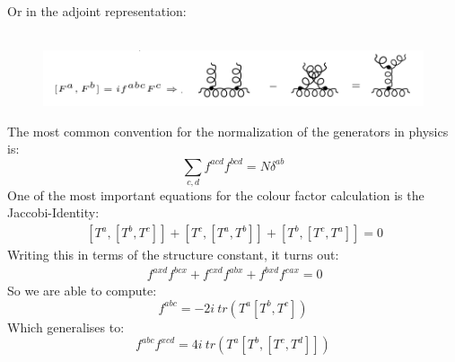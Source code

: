 Or in the adjoint representation:\\
\\
\begin{figure}[h!]
\centering
\includegraphics[scale=0.6]{images/Intro/CasimirAdj.png}
\end{figure}

The most common convention for the normalization of the generators in physics is:
\begin{equation}
\displaystyle\sum\limits_{c,d} f^{acd} f^{bcd} = N \delta^{ab}
\end{equation}
One of the most important equations for the colour factor calculation is the Jaccobi-Identity:
\begin{equation}
\begin{split}\:
[T^a, [T^b , T^c]]+[T^c, [T^a , T^b]]+[T^b, [T^c , T^a]]=0
\end{split}
\end{equation}
Writing this in terms of the structure constant, it turns out:
\begin{equation}
\begin{split}\:
f^{axd} f^{bcx} +  f^{cxd} f^{abx} +f^{bxd} f^{cax} =0
\end{split}
\end{equation}
So we are able to compute:
\begin{equation}
f^{abc} = -2i\: tr(T^a[T^b, T^c])
\end{equation}
Which generalises to:
\begin{equation}
f^{abc}f^{xcd} = 4i\: tr(T^a[T^b, [T^c, T^d]])
\end{equation}

